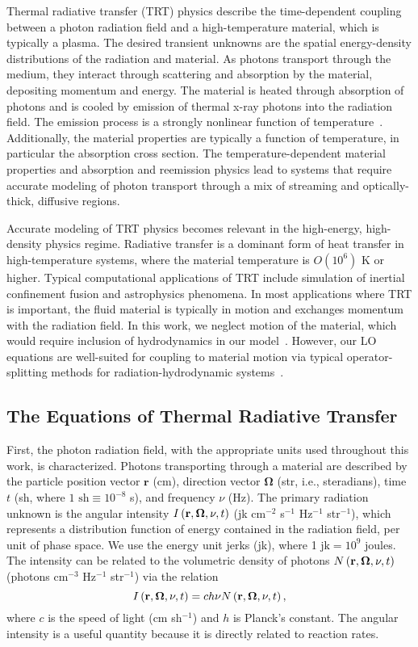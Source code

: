 Thermal radiative transfer (TRT) physics describe the time-dependent coupling between a photon
radiation field and a high-temperature material, which is typically a plasma.  The desired
transient unknowns are the spatial
energy-density distributions of the radiation and material.  As photons transport through
the medium, they interact through scattering and absorption by the material, depositing
momentum and energy.  The
material is heated through absorption of photons and is cooled by emission of thermal
x-ray photons
into the radiation field.  The emission process is a strongly nonlinear
function of temperature~\cite{mihalas}.  Additionally, the  material properties are
typically a function of temperature, in particular the absorption cross section.  The
temperature-dependent material properties and
absorption and reemission physics lead to systems that require accurate modeling of
photon transport through a mix of
streaming and optically-thick, diffusive regions. 

Accurate modeling of TRT physics becomes relevant in the high-energy,
high-density physics regime.   Radiative transfer is a dominant form of heat transfer in
high-temperature systems, where the material temperature is $O(10^6)$ K or
higher. Typical computational applications of TRT include simulation of inertial confinement fusion and
astrophysics phenomena.  In most applications where TRT is important, the fluid
material is typically in motion and exchanges momentum with the radiation field. In this work, we neglect
motion of the material, which would require inclusion of hydrodynamics in our
model~\cite{mihalas}.  However, our LO equations are well-suited for
coupling to material motion via typical operator-splitting methods for
radiation-hydrodynamic systems~\cite{radhydro_code,os_rh}.

\subsection{The Equations of Thermal Radiative Transfer}

First, the photon radiation field, with the appropriate units used throughout this work, is
characterized.  Photons transporting through a material are described by the particle position vector
$\mathbf{r}$ (cm), direction vector $\mathbf\Omega$ (str, i.e., steradians),
time $t$ (sh, where $1\text{ sh}\equiv10^{-8}$ s), and frequency $\nu$ (Hz).  The primary
radiation unknown is the angular intensity $I \left(\mathbf{r},\mathbf{\Omega},\nu,t\right)$ (jk cm$^{-2}$ s$^{-1}$
Hz$^{-1}$ str$^{-1}$), which represents a distribution
function of energy
contained in the radiation field, per unit of
phase space.  We use the energy unit jerks (jk), where 1 $\text{jk}= 10^9$ joules. The intensity can be related to the volumetric density of photons
$N \left(\mathbf{r},\mathbf{\Omega},\nu,t\right)$ (photons cm$^{-3}$ Hz$^{-1}$ str$^{-1}$) via the relation
\begin{equation}\label{eq:intens_dens}
    I\left(\mathbf{r},\mathbf{\Omega},\nu,t\right) = c h \nu N \left(\mathbf{r},\mathbf{\Omega},\nu,t\right),
\end{equation}
where $c$ is the speed of light (cm sh$^{-1}$) and $h$ is Planck's constant. The
angular intensity is a useful quantity because it is directly related to reaction rates.

